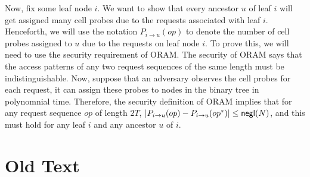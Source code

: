 Now, fix some leaf node $i$.
We want to show that every ancestor $u$ of leaf $i$
will get assigned 
many cell probes 
due to the requests associated with leaf $i$.
Henceforth, we will use the notation $P_{i \rightarrow u}(op)$
to denote the number of cell probes assigned to $u$ 
due to the requests on leaf node $i$.  
To prove this, we will need to use the security requirement  
of ORAM. 
The security of ORAM says that the access patterns
of any two request sequences of the same length 
must be indistinguishable.
Now, suppose that an adversary 
observes the cell probes
for each request, it  
can assign these probes to nodes in the binary tree 
in polynomnial time.
Therefore, the security definition of ORAM implies
that for any 
request sequence $op$ of length $2T$,  
$|P_{i \rightarrow u}(op) - 
P_{i \rightarrow u}(op^*)| \leq {\sf negl}(N)$,
and this must hold for any leaf $i$ and any ancestor $u$ of $i$.











\section{Old Text}


